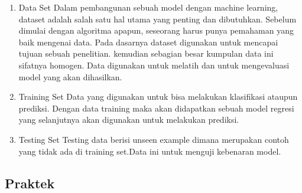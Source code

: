 \begin{enumerate}
\item{Data Set}
Dalam pembangunan sebuah model dengan machine learning, dataset  adalah salah satu hal utama yang penting dan dibutuhkan. Sebelum dimulai dengan algoritma apapun, seseorang harus punya pemahaman yang baik mengenai data. Pada dasarnya dataset digunakan untuk mencapai tujuan sebuah penelitian. kemudian sebagian besar kumpulan data ini sifatnya homogen. Data digunakan untuk melatih dan untuk mengevaluasi model yang akan dihasilkan.

\item{Training Set}
Data yang digunakan untuk bisa melakukan klasifikasi ataupun prediksi. Dengan data training maka akan didapatkan sebuah model regresi yang selanjutnya akan digunakan untuk melakukan prediksi.

\item{Testing Set}
 Testing data berisi unseen example dimana merupakan contoh yang tidak ada di training set.Data ini untuk menguji kebenaran model.
	\end{enumerate}
	
\subsection{Praktek}
